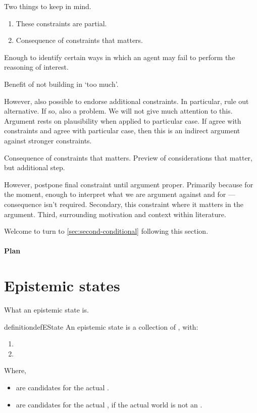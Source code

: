 \begin{note}
  Two things to keep in mind.

  \begin{enumerate}
  \item These constraints are partial.
  \item Consequence of constraints that matters.
  \end{enumerate}

  Enough to identify certain ways in which an agent may fail to perform the reasoning of interest.

  Benefit of not building in `too much'.

  However, also possible to endorse additional constraints.
  In particular, rule out alternative.
  If so, also a problem.
  We will not give much attention to this.
  Argument rests on plausibility when applied to particular case.
  If agree with constraints and agree with particular case, then this is an indirect argument against stronger constraints.


  Consequence of constraints that matters.
  Preview of considerations that matter, but additional step.

  However, postpone final constraint until argument proper.
  Primarily because for the moment, enough to interpret what we are argument against and for --- consequence isn't required.
  Secondary, this constraint where it matters in the argument.
  Third, surrounding motivation and context within literature.

  Welcome to turn to \autoref{sec:second-conditional} following this section.
\end{note}

\paragraph{Plan}


\section{Epistemic states}
\label{sec:epistemic-states}

\begin{note}
  What an epistemic state is.
\end{note}

\begin{note}
  \begin{restatable}{definition}{defEState}
    An epistemic state is a collection of , with:
    \begin{enumerate}
    \item {}
    \item {}
    \end{enumerate}
    Where,
    \begin{itemize}
    \item {} are candidates for the actual \world{}.
    \item {} are candidates for the actual \world{}, if the actual world is not an .
    \end{itemize}
  \end{restatable}
\end{note}

